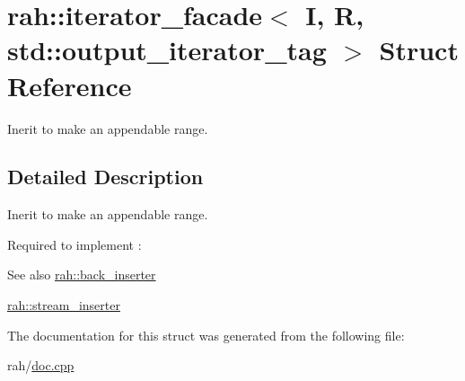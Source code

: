 \hypertarget{structrah_1_1iterator__facade_3_01_i_00_01_r_00_01std_1_1output__iterator__tag_01_4}{}\section{rah\+::iterator\+\_\+facade$<$ I, R, std\+::output\+\_\+iterator\+\_\+tag $>$ Struct Reference}
\label{structrah_1_1iterator__facade_3_01_i_00_01_r_00_01std_1_1output__iterator__tag_01_4}


Inerit to make an appendable range.  




\subsection{Detailed Description}
Inerit to make an appendable range. 

Required to implement \+: 
\begin{DoxyCode}{0}
\end{DoxyCode}
 \begin{DoxySeeAlso}{See also}
\mbox{\hyperlink{namespacerah_a0698f952bc3c4f1961929bbddb5812fe}{rah\+::back\+\_\+inserter}} 

\mbox{\hyperlink{namespacerah_a3f7b590b1bd8a44b5b2d6f4e35f1837c}{rah\+::stream\+\_\+inserter}} 
\end{DoxySeeAlso}


The documentation for this struct was generated from the following file\+:\begin{DoxyCompactItemize}
\item 
rah/\mbox{\hyperlink{doc_8cpp}{doc.\+cpp}}\end{DoxyCompactItemize}
